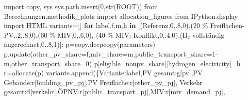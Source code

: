 \documentclass[
  ngerman,
  a4paper,
  DIV=11]{scrreprt}
\newenvironment{Shaded}{\begin{snugshade}}{\end{snugshade}}
\newcommand{\BuiltInTok}[1]{\textcolor[rgb]{0.00,0.23,0.31}{#1}}
\newcommand{\ControlFlowTok}[1]{\textcolor[rgb]{0.00,0.23,0.31}{\textbf{#1}}}
\newcommand{\DecValTok}[1]{\textcolor[rgb]{0.68,0.00,0.00}{#1}}
\newcommand{\FloatTok}[1]{\textcolor[rgb]{0.68,0.00,0.00}{#1}}
\newcommand{\ImportTok}[1]{\textcolor[rgb]{0.00,0.46,0.62}{#1}}
\newcommand{\KeywordTok}[1]{\textcolor[rgb]{0.00,0.23,0.31}{\textbf{#1}}}
\newcommand{\NormalTok}[1]{\textcolor[rgb]{0.00,0.23,0.31}{#1}}
\newcommand{\OperatorTok}[1]{\textcolor[rgb]{0.37,0.37,0.37}{#1}}
\newcommand{\SpecialCharTok}[1]{\textcolor[rgb]{0.37,0.37,0.37}{#1}}
\newcommand{\StringTok}[1]{\textcolor[rgb]{0.13,0.47,0.30}{#1}}
\begin{document}
\begin{Shaded}
\begin{Highlighting}[]
\ImportTok{import}\NormalTok{ copy, sys}
\NormalTok{sys.path.insert(}\DecValTok{0}\NormalTok{,}\BuiltInTok{str}\NormalTok{(ROOT))}
\ImportTok{from}\NormalTok{ Berechnungen.methodik\_plots }\ImportTok{import}\NormalTok{ allocation\_figures}
\ImportTok{from}\NormalTok{ IPython.display }\ImportTok{import}\NormalTok{ HTML}
\NormalTok{variants}\OperatorTok{=}\NormalTok{[]}
\ControlFlowTok{for}\NormalTok{ label,f,m,h }\KeywordTok{in}\NormalTok{ [(}\StringTok{\textquotesingle{}Referenz\textquotesingle{}}\NormalTok{,}\DecValTok{0}\NormalTok{,}\FloatTok{.8}\NormalTok{,}\DecValTok{0}\NormalTok{),(}\StringTok{\textquotesingle{}20 }\SpecialCharTok{\% F}\StringTok{reiflächen{-}PV\textquotesingle{}}\NormalTok{,}\FloatTok{.2}\NormalTok{,}\FloatTok{.8}\NormalTok{,}\DecValTok{0}\NormalTok{),(}\StringTok{\textquotesingle{}60 \% MIV\textquotesingle{}}\NormalTok{,}\DecValTok{0}\NormalTok{,}\FloatTok{.6}\NormalTok{,}\DecValTok{0}\NormalTok{),}
\NormalTok{                    (}\StringTok{\textquotesingle{}40 \% MIV: Konflikt\textquotesingle{}}\NormalTok{,}\DecValTok{0}\NormalTok{,}\FloatTok{.4}\NormalTok{,}\DecValTok{0}\NormalTok{),(}\StringTok{\textquotesingle{}H₂ vollständig angerechnet\textquotesingle{}}\NormalTok{,}\DecValTok{0}\NormalTok{,}\FloatTok{.8}\NormalTok{,}\DecValTok{1}\NormalTok{)]:}
\NormalTok{    p}\OperatorTok{=}\NormalTok{copy.deepcopy(parameters)}
\NormalTok{    p.update(other\_pv\_share}\OperatorTok{=}\NormalTok{f,miv\_share}\OperatorTok{=}\NormalTok{m,public\_transport\_share}\OperatorTok{=}\DecValTok{1}\OperatorTok{{-}}\NormalTok{m,other\_transport\_share}\OperatorTok{=}\DecValTok{0}\NormalTok{)}
\NormalTok{    p[}\StringTok{\textquotesingle{}eligible\_nonpv\_share\textquotesingle{}}\NormalTok{][}\StringTok{\textquotesingle{}hydrogen\_electricity\textquotesingle{}}\NormalTok{]}\OperatorTok{=}\NormalTok{h}
\NormalTok{    r}\OperatorTok{=}\NormalTok{allocate(p)}
\NormalTok{    variants.append(\{}\StringTok{\textquotesingle{}Variante\textquotesingle{}}\NormalTok{:label,}\StringTok{\textquotesingle{}PV gesamt\textquotesingle{}}\NormalTok{:g[}\StringTok{\textquotesingle{}pv\textquotesingle{}}\NormalTok{],}\StringTok{\textquotesingle{}PV Gebäude\textquotesingle{}}\NormalTok{:r[}\StringTok{\textquotesingle{}building\_pv\_pj\textquotesingle{}}\NormalTok{],}\StringTok{\textquotesingle{}PV Freifläche\textquotesingle{}}\NormalTok{:r[}\StringTok{\textquotesingle{}other\_pv\_pj\textquotesingle{}}\NormalTok{],}
                     \StringTok{\textquotesingle{}Verkehr gesamt\textquotesingle{}}\NormalTok{:d[}\StringTok{\textquotesingle{}verkehr\textquotesingle{}}\NormalTok{],}\StringTok{\textquotesingle{}ÖPNV\textquotesingle{}}\NormalTok{:r[}\StringTok{\textquotesingle{}public\_transport\_pj\textquotesingle{}}\NormalTok{],}\StringTok{\textquotesingle{}MIV\textquotesingle{}}\NormalTok{:r[}\StringTok{\textquotesingle{}miv\_demand\_pj\textquotesingle{}}\NormalTok{],}

\end{Highlighting}
\end{Shaded}
\end{document}
